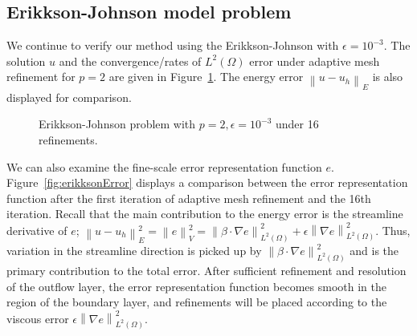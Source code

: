 \documentclass[final,leqno]{siamltex}
\newcommand{\nor}[1]{\left\| #1 \right\|}
\newcommand{\LRp}[1]{\left( #1 \right)}
\newcommand{\Grad} {\ensuremath{\nabla}}
\renewcommand{\L}{L^2\LRp{\Omega}}
\begin{document}
\subsection{Erikkson-Johnson model problem}

We continue to verify our method using the Erikkson-Johnson with $\epsilon = 10^{-3}$.  The solution $u$ and the convergence/rates of $\L$ error under adaptive mesh refinement for $p=2$ are given in Figure~\ref{fig:erikksonAdapt}.  The energy error $\nor{u-u_h}_E$ is also displayed for comparison.  
\begin{figure}[!h]
\centering
{}
\caption{Erikkson-Johnson problem with $p = 2, \epsilon = 10^{-3}$ under 16 refinements.}
\label{fig:erikksonAdapt}
\end{figure}

We can also examine the fine-scale error representation function $e$.  Figure~\ref{fig:erikksonError} displays a comparison between the error representation function after the first iteration of adaptive mesh refinement and the 16th iteration.  Recall that the main contribution to the energy error is the streamline derivative of $e$; $\nor{u-u_h}_E^2 = \nor{e}_V^2 = \nor{\beta \cdot \Grad e}_{\L}^2 + \epsilon\nor{\Grad e}_{\L}^2$. Thus, variation in the streamline direction is picked up by $\nor{\beta\cdot \Grad e}_{\L}^2$ and is the primary contribution to the total error.  After sufficient refinement and resolution of the outflow layer, the error representation function becomes smooth in the region of the boundary layer, and refinements will be placed according to the viscous error $\epsilon\nor{\Grad e}_{\L}^2$. 
\end{document}
